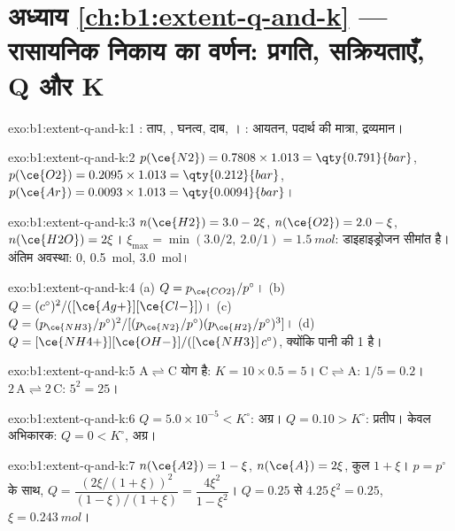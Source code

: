 \section*{अध्याय \ref{ch:b1:extent-q-and-k} --- रासायनिक निकाय का वर्णन: प्रगति, सक्रियताएँ, Q और K}

\begin{solution}{exo:b1:extent-q-and-k:1}
: ताप, , घनत्व, दाब, । : आयतन, पदार्थ की मात्रा, द्रव्यमान।
\end{solution}

\begin{solution}{exo:b1:extent-q-and-k:2}
$p(\ce{N2}) = 0.7808 \times 1.013 = \qty{0.791}{bar}$, $p(\ce{O2}) =
0.2095 \times 1.013 = \qty{0.212}{bar}$, $p(\ce{Ar}) = 0.0093 \times 1.013
= \qty{0.0094}{bar}$।
\end{solution}

\begin{solution}{exo:b1:extent-q-and-k:3}
$n(\ce{H2}) = 3.0 - 2\xi$, $n(\ce{O2}) = 2.0 - \xi$, $n(\ce{H2O}) =
2\xi$। $\xi_{\max} = \min(3.0/2,\ 2.0/1) = \qty{1.5}{mol}$: डाइहाइड्रोजन
सीमांत है। अंतिम अवस्था:  0,  \qty{0.5}{mol}, 
\qty{3.0}{mol}।
\end{solution}

\begin{solution}{exo:b1:extent-q-and-k:4}
(a) $Q = p_{\ce{CO2}}/p^\circ$। (b) $Q = (c^\circ)^2/([\ce{Ag+}][\ce{Cl-}])$।
(c) $Q = (p_{\ce{NH3}}/p^\circ)^2/[(p_{\ce{N2}}/p^\circ)(p_{\ce{H2}}/p^\circ)^3]$।
(d) $Q = [\ce{NH4+}][\ce{OH-}]/([\ce{NH3}]\,c^\circ)$, क्योंकि पानी की  1 है।
\end{solution}

\begin{solution}{exo:b1:extent-q-and-k:5}
$\mathrm{A \rightleftharpoons C}$ योग है: $K = 10 \times 0.5 = 5$। $\mathrm{C \rightleftharpoons A}$: $1/5 =
0.2$। $\mathrm{2\,A \rightleftharpoons 2\,C}$: $5^2 = 25$।
\end{solution}

\begin{solution}{exo:b1:extent-q-and-k:6}
$Q = 5.0 \times 10^{-5} < K^\circ$: अग्र। $Q = 0.10 > K^\circ$: प्रतीप।
केवल अभिकारक: $Q = 0 < K^\circ$, अग्र।
\end{solution}

\begin{solution}{exo:b1:extent-q-and-k:7}
$n(\ce{A2}) = 1 - \xi$, $n(\ce{A}) = 2\xi$, कुल $1 + \xi$। $p =
p^\circ$ के साथ, $Q = \dfrac{(2\xi/(1+\xi))^2}{(1-\xi)/(1+\xi)} = \dfrac{4\xi^2}{1 -
\xi^2}$। $Q = 0.25$ से $4.25\,\xi^2 = 0.25$, $\xi = \qty{0.243}{mol}$।
\end{solution}

